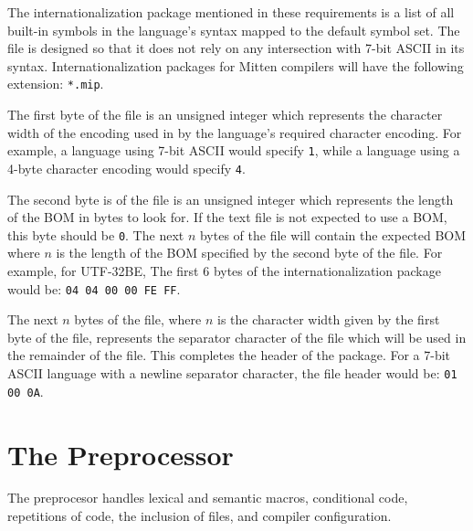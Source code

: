 \documentclass[10pt,a4paper]{article}
\begin{document}
The internationalization package mentioned in these requirements is a list of all built-in symbols in the language's syntax mapped to the default symbol set. The file is designed so that it does not rely on any intersection with 7-bit ASCII in its syntax. Internationalization packages for Mitten compilers will have the following extension: \verb|*.mip|. 

The first byte of the file is an unsigned integer which represents the character width of the encoding used in by the language's required character encoding. For example, a language using 7-bit ASCII would specify \verb|1|, while a language using a 4-byte character encoding would specify \verb|4|.

The second byte is of the file is an unsigned integer which represents the length of the BOM in bytes to look for. If the text file is not expected to use a BOM, this byte should be \verb|0|. The next $n$ bytes of the file will contain the expected BOM where $n$ is the length of the BOM specified by the second byte of the file. For example, for UTF-32BE, The first 6 bytes of the internationalization package would be: \verb|04 04 00 00 FE FF|.

The next $n$ bytes of the file, where $n$ is the character width given by the first byte of the file, represents the separator character of the file which will be used in the remainder of the file. This completes the header of the package. For a 7-bit ASCII language with a newline separator character, the file header would be: \verb|01 00 0A|.

\section{The Preprocessor}
The preprocesor handles lexical and semantic macros, conditional code, repetitions of code, the inclusion of files, and compiler configuration. 
\end{document}
